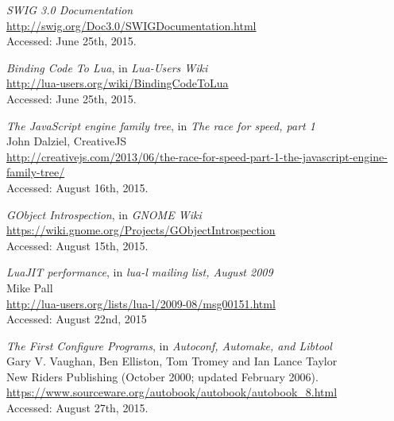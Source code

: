 \begin{thebibliography}{99}
		\emph{SWIG 3.0 Documentation} \\
		\url{http://swig.org/Doc3.0/SWIGDocumentation.html} \\
		Accessed: June 25th, 2015.

		\emph{Binding Code To Lua}, in \emph{Lua-Users Wiki} \\
		\url{http://lua-users.org/wiki/BindingCodeToLua} \\
		Accessed: June 25th, 2015.

		\emph{The JavaScript engine family tree},
		in \emph{The race for speed, part 1}  \\
		John Dalziel, CreativeJS \\
		\url{http://creativejs.com/2013/06/the-race-for-speed-part-1-the-javascript-engine-family-tree/} \\
		Accessed: August 16th, 2015.

		\emph{GObject Introspection}, in \emph{GNOME Wiki} \\
		\url{https://wiki.gnome.org/Projects/GObjectIntrospection} \\
		Accessed: August 15th, 2015.

		\emph{LuaJIT performance}, in \emph{lua-l mailing list, August 2009} \\
		Mike Pall \\
		\url{http://lua-users.org/lists/lua-l/2009-08/msg00151.html} \\
		Accessed: August 22nd, 2015

		\emph{The First Configure Programs},
		in \emph{Autoconf, Automake, and Libtool} \\
		Gary V. Vaughan, Ben Elliston, Tom Tromey and Ian Lance Taylor \\
		New Riders Publishing (October 2000; updated February 2006). \\
		\url{https://www.sourceware.org/autobook/autobook/autobook_8.html} \\
		Accessed: August 27th, 2015.

\end{thebibliography}

